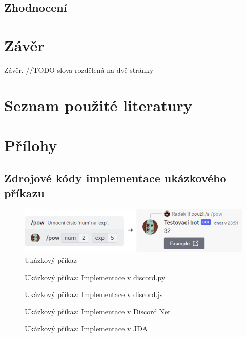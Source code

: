 \documentclass[FM]{tulthesis}
\begin{document}
	
	\section{Zhodnocení}
	
	\chapter{Závěr}
	
	Závěr. //TODO slova rozdělená na dvě stránky%
	
	\chapter*{Seznam použité literatury}
	\printbibliography[heading=none]
	
	\appendix
	\chapter{Přílohy}
	
	\section{Zdrojové kódy implementace ukázkového příkazu}
	
	\begin{figure}[ht]
		\centering
		\includegraphics[width=\textwidth]{img/ExampleCommand}
		\caption{Ukázkový příkaz}
		\label{_tag_img_pow}
	\end{figure}
	
	\begin{figure}[ht]
		
		\caption{Ukázkový příkaz: Implementace v discord.py}
	\end{figure}
	
	\begin{figure}[ht]
		
		\caption{Ukázkový příkaz: Implementace v discord.js}
	\end{figure}
	
	\begin{figure}[ht]
		
		\caption{Ukázkový příkaz: Implementace v Discord.Net}
	\end{figure}
	
	\begin{figure}[ht]
		
		\caption{Ukázkový příkaz: Implementace v JDA}
	\end{figure}
	
\end{document}
